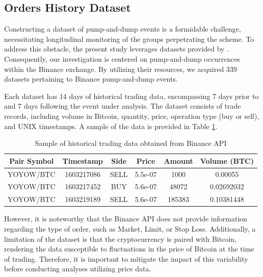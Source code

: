 \documentclass[12pt]{article}
\begin{document}
    \subsection{Orders History Dataset}
	\label{subsec_met_dataset}

    Constructing a dataset of pump-and-dump events is a formidable challenge, necessitating longitudinal monitoring of the groups perpetrating the scheme.
    To address this obstacle, the present study leverages datasets provided by \citet{lamorgia2020}.
    Consequently, our investigation is centered on pump-and-dump occurrences within the Binance exchange.
    By utilizing their resources, we acquired 339 datasets pertaining to Binance pump-and-dump events.

    Each dataset has 14 days of historical trading data, encompassing 7 days prior to and 7 days following the event under analysis.
    The dataset consists of trade records, including volume in Bitcoin, quantity, price, operation type (buy or sell), and UNIX timestamps.
    A sample of the data is provided in Table \ref{tab_dataset_sample}.

    \begin{table}[!ht]
        \centering
        \caption{Sample of historical trading data obtained from Binance API}
        \begin{tabular}{cccccc}
            \toprule
            \textbf{Pair Symbol} & \textbf{Timestamp} & \textbf{Side} & \textbf{Price} & \textbf{Amount} & \textbf{Volume (BTC)} \\
            \midrule
            YOYOW/BTC & 1603217086 & SELL & 5.5e-07 & 1000 & 0.00055 \\
            YOYOW/BTC & 1603217452 & BUY & 5.6e-07 & 48072 & 0.02692032 \\
            YOYOW/BTC & 1603219189 & SELL & 5.6e-07 & 185383 & 0.10381448 \\
            \bottomrule
        \end{tabular}
        \label{tab_dataset_sample}
    \end{table}

    However, it is noteworthy that the Binance API does not provide information regarding the type of order, such as Market, Limit, or Stop Loss.
    Additionally, a limitation of the dataset is that the cryptocurrency is paired with Bitcoin, rendering the data susceptible to fluctuations in the price of Bitcoin at the time of trading.
    Therefore, it is important to mitigate the impact of this variability before conducting analyses utilizing price data.
\end{document}
